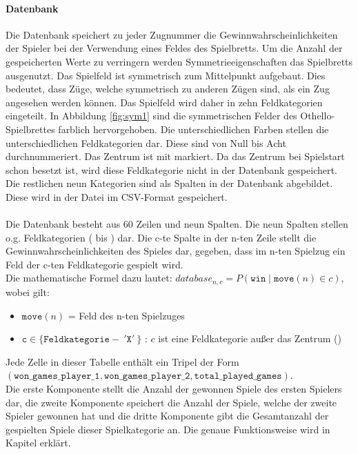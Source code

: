 \paragraph{Datenbank}
\label{para:db}
Die Datenbank speichert zu jeder Zugnummer die Gewinnwahrscheinlichkeiten der Spieler bei der Verwendung eines Feldes des Spielbretts. Um die Anzahl der gespeicherten Werte zu verringern werden Symmetrieeigenschaften das Spielbretts ausgenutzt. 
Das Spielfeld ist symmetrisch zum Mittelpunkt aufgebaut. Dies bedeutet, dass Züge, welche symmetrisch zu anderen Zügen sind, als ein Zug angesehen werden können. Das Spielfeld wird daher in zehn Feldkategorien eingeteilt. In Abbildung \ref{fig:sym1} sind die symmetrischen Felder des Othello-Spielbrettes farblich hervorgehoben. Die unterschiedlichen Farben stellen die unterschiedlichen Feldkategorien dar. Diese sind von Null bis Acht durchnummeriert. Das Zentrum ist mit  markiert. Da das Zentrum bei Spielstart schon besetzt ist, wird diese Feldkategorie nicht in der Datenbank gespeichert. Die restlichen neun Kategorien sind als Spalten in der Datenbank abgebildet. Diese wird in der Datei  im CSV-Format gespeichert.
\\
\\Die Datenbank besteht aus 60 Zeilen und neun Spalten. Die neun Spalten stellen o.g. Feldkategorien ( bis ) dar. Die c-te Spalte in der n-ten Zeile stellt die Gewinnwahrscheinlichkeiten des Spieles dar, gegeben, dass im n-ten Spielzug ein Feld der c-ten Feldkategorie gespielt wird. 
\\Die mathematische Formel dazu lautet:
$database_{n,c} = P( \mathtt{win} \mid \mathtt{move}(n) \in c)$, wobei gilt:
\begin{itemize}
\item $\mathtt{move}(n)$ = Feld des n-ten Spielzuges
\item $\mathtt{c} \in \{\mathtt{Feldkategorie} -\ '\mathtt{X}'\ \}$ : $c$ ist eine Feldkategorie außer das Zentrum ()
\end{itemize}
Jede Zelle in dieser Tabelle enthält ein Tripel der Form \\$( \mathtt{won\_games\_player\_1}, \mathtt{won\_games\_player\_2}, \mathtt{total\_played\_games})$. 
\\Die erste Komponente stellt die Anzahl der gewonnen Spiele des ersten Spielers dar, die zweite Komponente speichert die Anzahl der Spiele, welche der zweite Spieler gewonnen hat und die dritte Komponente gibt die Gesamtanzahl der gespielten Spiele dieser Spielkategorie an. Die genaue Funktionsweise wird in Kapitel  erklärt.
